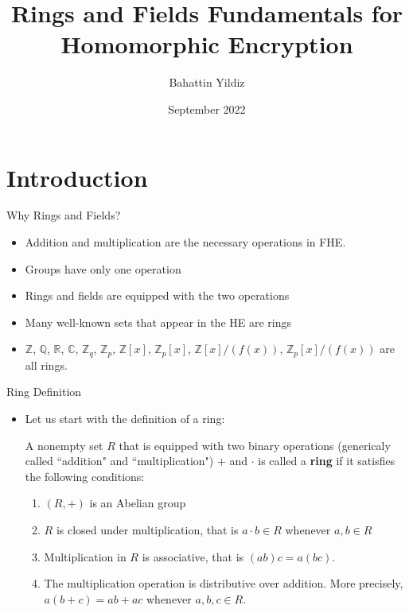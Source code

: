 \documentclass[ %
 10pt, xcolor={dvipsnames,svgnames,x11names,hyperref},
   hyperref={colorlinks=true,citecolor=green,linkcolor=DarkRed,urlcolor=ProcessBlue,anchorcolor=blue}
  ]{beamer}
\newenvironment{stepitemize}{\begin{itemize}[<+->]}{\end{itemize} }
\newcommand{\Z}{\mathbb{Z}}
\newcommand{\Q}{\mathbb{Q}}
\newcommand{\R}{\mathbb{R}}
\newcommand{\C}{\mathbb{C}}
\begin{document}
\title[Rings and Fields Fundamentals]{
Rings and Fields Fundamentals for Homomorphic Encryption}
\author{Bahattin Yildiz}
\date[September]{September 2022}
\maketitle

\section{Introduction}

\begin{frame}{Why Rings and Fields?}
\begin{stepitemize}
    \item Addition and multiplication are the necessary operations in FHE.
    \item Groups have only one operation
    \item Rings and fields are equipped with the two operations
    \item Many well-known sets that appear in the HE are rings
    \item $\Z$, $\Q$, $\R$, $\C$, $\Z_q$, $\Z_p$, $\Z[x]$, $\Z_p[x]$, $\Z[x]/(f(x))$, $\Z_p[x]/(f(x))$ are all rings.
\end{stepitemize}
\end{frame}

\begin{frame}{Ring Definition}
\begin{stepitemize}
\item Let us start with the definition of a ring:
\begin{definition}
A nonempty set $R$ that is equipped with two binary operations (genericaly called ``addition" and ``multiplication") $+$ and $\cdot$ is called a {\bf ring} if it satisfies the following conditions:
\begin{enumerate}
    \item $(R,+)$ is an Abelian group
 \item $R$ is closed under multiplication, that is $a\cdot b \in R$ whenever $a,b\in R$
 \item Multiplication in $R$ is associative, that is $(ab)c=a(bc)$.
 \item The multiplication operation is distributive over addition. More precisely, $a(b+c)=ab+ac$ whenever $a, b, c \in R$.
\end{enumerate}
\end{definition}
\end{stepitemize}

\end{frame}
\end{document}
